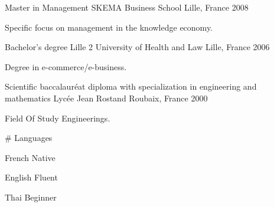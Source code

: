 

\begin{cventries}

  \cventry
    {Master in Management} %
    {SKEMA Business School} %
    {Lille, France} %
    {2008} %
    {
      \begin{cvitems} %
        \item {Specific focus on management in the knowledge economy.}
      \end{cvitems}
    }
    { } %
  \cventry
    {Bachelor's degree} %
    {Lille 2 University of Health and Law} %
    {Lille, France} %
    {2006} %
    {
      \begin{cvitems} %
        \item {Degree in e-commerce/e-business.}
      \end{cvitems}
    }
    { } %
      \cventry
        {Scientific baccalauréat diploma with specialization in engineering and mathematics} %
        {Lycée Jean Rostand} %
        {Roubaix, France} %
        {2000} %
        {
          \begin{cvitems} %
            \item {Field Of Study Engineerings.}
          \end{cvitems}
        }
        { } %
  \cventry
    {} %
    {\# Languages} %
    { } %
    { } %
    {
      \begin{cvitems} %
        \item {French Native}
        \item {English Fluent}
        \item {Thai Beginner}
      \end{cvitems}
    }
    { } %

\end{cventries}
